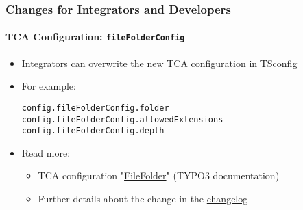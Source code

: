 %

\begin{frame}[fragile]
	\frametitle{Changes for Integrators and Developers}
	\framesubtitle{TCA Configuration: \texttt{fileFolderConfig}}


	\begin{itemize}
		\item Integrators can overwrite the new TCA configuration in TSconfig
		\item For example:
\begin{lstlisting}
config.fileFolderConfig.folder
config.fileFolderConfig.allowedExtensions
config.fileFolderConfig.depth
\end{lstlisting}

		\item Read more:

			\begin{itemize}
				\item TCA configuration
					"\href{https://docs.typo3.org/m/typo3/reference-tca/master/en-us/ColumnsConfig/Type/Select/Properties/FileFolder.html#filefolder}{FileFolder}"
					(TYPO3 documentation)
				\item Further details about the change in the \href{https://docs.typo3.org/c/typo3/cms-core/master/en-us/Changelog/11.4/Feature-94406-OverrideFileFolderTCAConfigurationWithTSconfig.html}{changelog}
		\end{itemize}

	\end{itemize}

\end{frame}

